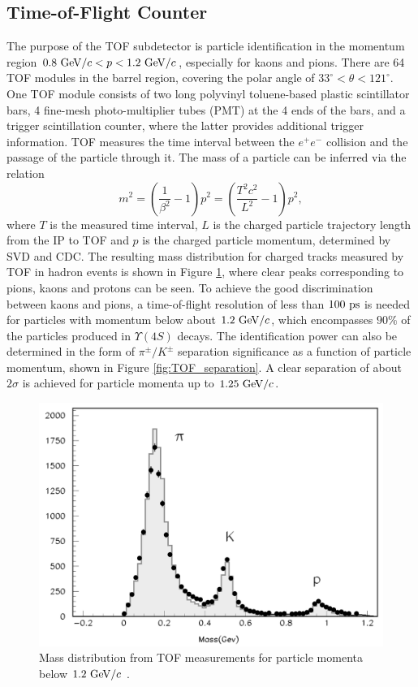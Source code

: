 \subsection{Time-of-Flight Counter}

The purpose of the TOF subdetector is particle identification in the momentum region $0.8\mathrm{~GeV}/c < p < 1.2\mathrm{~GeV}/c$, especially for kaons and pions. There are 64 TOF modules in the barrel region, covering the polar angle of $33^\circ < \theta < 121^\circ$. One TOF module consists of two long polyvinyl toluene-based plastic scintillator bars, 4 fine-mesh photo-multiplier tubes (PMT) at the 4 ends of the bars, and a trigger scintillation counter, where the latter provides additional trigger information. TOF measures the time interval between the $e^+e^-$ collision and the passage of the particle through it. The mass of a particle can be inferred via the relation
\begin{equation}
m^2 = \left( \frac{1}{\beta^2}-1\right)p^2 = \left( \frac{T^2c^2}{L^2}-1\right)p^2,
\end{equation}
where $T$ is the measured time interval, $L$ is the charged particle trajectory length from the IP to TOF and $p$ is the charged particle momentum, determined by SVD and CDC. The resulting mass distribution for charged tracks measured by TOF in hadron events is shown in Figure \ref{fig:TOF_mass}, where clear peaks corresponding to pions, kaons and protons can be seen. To achieve the good discrimination between kaons and pions, a time-of-flight resolution of less than $100\mathrm{~ps}$ is needed for particles with momentum below about $1.2\mathrm{~GeV}/c$, which encompasses $90\%$ of the particles produced in $\Upsilon(4S)$ decays. The identification power can also be determined in the form of $\pi^\pm/K^\pm$ separation significance as a function of particle momentum, shown in Figure \ref{fig:TOF_separation}. A clear separation of about $2\sigma$ is achieved for particle momenta up to $1.25\mathrm{~GeV}/c$.

\begin{figure}[!htb]
	\centering
	\captionsetup{width=0.8\linewidth}
	\includegraphics[width=0.6\linewidth]{fig/setup/TOF_mass}
	\caption{Mass distribution from TOF measurements for particle momenta below $1.2\mathrm{~GeV}/c$ \cite{ABASHIAN2002117}.}
	\label{fig:TOF_mass}
\end{figure}

